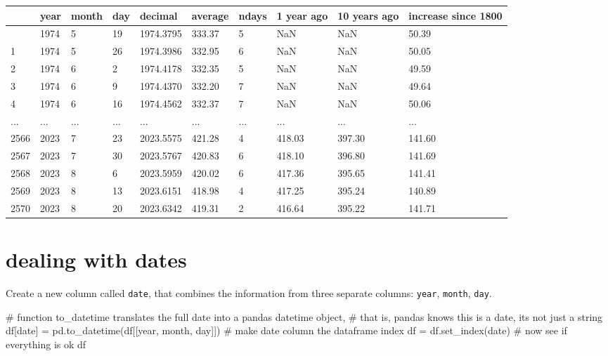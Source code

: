 \documentclass[
  letterpaper,
  DIV=11,
  numbers=noendperiod]{scrreprt}
\newenvironment{Shaded}{\begin{snugshade}}{\end{snugshade}}
\newcommand{\CommentTok}[1]{\textcolor[rgb]{0.37,0.37,0.37}{#1}}
\newcommand{\NormalTok}[1]{\textcolor[rgb]{0.00,0.23,0.31}{#1}}
\newcommand{\OperatorTok}[1]{\textcolor[rgb]{0.37,0.37,0.37}{#1}}
\newcommand{\StringTok}[1]{\textcolor[rgb]{0.13,0.47,0.30}{#1}}
\begin{document}
\begin{longtable}[]{@{}llllllllll@{}}
\toprule\noalign{}
& year & month & day & decimal & average & ndays & 1 year ago & 10 years
ago & increase since 1800 \\
\midrule\noalign{}
\endhead
\bottomrule\noalign{}
\endlastfoot
0 & 1974 & 5 & 19 & 1974.3795 & 333.37 & 5 & NaN & NaN & 50.39 \\
1 & 1974 & 5 & 26 & 1974.3986 & 332.95 & 6 & NaN & NaN & 50.05 \\
2 & 1974 & 6 & 2 & 1974.4178 & 332.35 & 5 & NaN & NaN & 49.59 \\
3 & 1974 & 6 & 9 & 1974.4370 & 332.20 & 7 & NaN & NaN & 49.64 \\
4 & 1974 & 6 & 16 & 1974.4562 & 332.37 & 7 & NaN & NaN & 50.06 \\
... & ... & ... & ... & ... & ... & ... & ... & ... & ... \\
2566 & 2023 & 7 & 23 & 2023.5575 & 421.28 & 4 & 418.03 & 397.30 &
141.60 \\
2567 & 2023 & 7 & 30 & 2023.5767 & 420.83 & 6 & 418.10 & 396.80 &
141.69 \\
2568 & 2023 & 8 & 6 & 2023.5959 & 420.02 & 6 & 417.36 & 395.65 &
141.41 \\
2569 & 2023 & 8 & 13 & 2023.6151 & 418.98 & 4 & 417.25 & 395.24 &
140.89 \\
2570 & 2023 & 8 & 20 & 2023.6342 & 419.31 & 2 & 416.64 & 395.22 &
141.71 \\
\end{longtable}

\section{dealing with dates}\label{dealing-with-dates}

Create a new column called \texttt{date}, that combines the information
from three separate columns: \texttt{year}, \texttt{month},
\texttt{day}.

\begin{Shaded}
\begin{Highlighting}[]
\CommentTok{\# function to\_datetime translates the full date into a pandas datetime object,}
\CommentTok{\# that is, pandas knows this is a date, it\textquotesingle{}s not just a string}
\NormalTok{df[}\StringTok{\textquotesingle{}date\textquotesingle{}}\NormalTok{] }\OperatorTok{=}\NormalTok{ pd.to\_datetime(df[[}\StringTok{\textquotesingle{}year\textquotesingle{}}\NormalTok{, }\StringTok{\textquotesingle{}month\textquotesingle{}}\NormalTok{, }\StringTok{\textquotesingle{}day\textquotesingle{}}\NormalTok{]])}
\CommentTok{\# make \textquotesingle{}date\textquotesingle{} column the dataframe index}
\NormalTok{df }\OperatorTok{=}\NormalTok{ df.set\_index(}\StringTok{\textquotesingle{}date\textquotesingle{}}\NormalTok{)}
\CommentTok{\# now see if everything is ok}
\NormalTok{df}
\end{Highlighting}
\end{Shaded}
\end{document}
